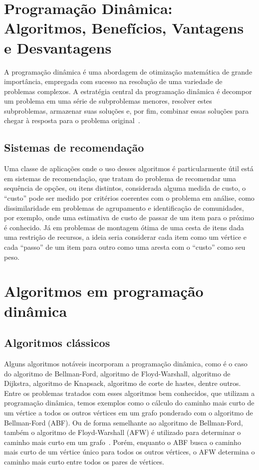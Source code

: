 \section{Programação Dinâmica: Algoritmos, Benefícios, Vantagens e Desvantagens}

A programação dinâmica é uma abordagem de otimização matemática de grande importância, empregada com sucesso na resolução de uma variedade de problemas complexos. A estratégia central da programação dinâmica é decompor um problema em uma série de subproblemas menores, resolver estes subproblemas, armazenar suas soluções e, por fim, combinar essas soluções para chegar à resposta para o problema original~\cite{Bellman1957}.

\subsection{Sistemas de recomendação}

Uma classe de aplicações onde o uso desses algoritmos é particularmente útil está em sistemas de recomendação, que tratam do problema de recomendar uma sequência de opções, ou itens distintos, considerada alguma medida de custo, o ``custo'' pode ser medido por critérios coerentes com o problema em análise, como dissimilaridade em problemas de agrupamento e identificação de comunidades, por exemplo, onde uma estimativa de custo de passar de um item para o próximo é conhecido. Já em problemas de montagem ótima de uma cesta de itens dada uma restrição de recursos, a ideia seria considerar cada item como um vértice e cada ``passo'' de um item para outro como uma aresta com o ``custo'' como seu peso.

\section{Algoritmos em programação dinâmica}
\subsection{Algoritmos clássicos}

Alguns algoritmos notáveis incorporam a programação dinâmica, como é o caso do algoritmo de Bellman-Ford, algoritmo de Floyd-Warshall, algoritmo de Dijkstra, algoritmo de Knapsack, algoritmo de corte de hastes, dentre outros. Entre os problemas tratados com esses algoritmos bem conhecidos, que utilizam a programação dinâmica, temos exemplos como o cálculo do caminho mais curto de um vértice a todos os outros vértices em um grafo ponderado com o algoritmo de Bellman-Ford (ABF). Ou de forma semelhante ao algoritmo de Bellman-Ford, também o algoritmo de Floyd-Warshall (AFW) é utilizado para determinar o caminho mais curto em um grafo~\cite{CormenLeisersonRivestStein2009}. Porém, enquanto o ABF busca o caminho mais curto de um vértice único para todos os outros vértices, o AFW determina o caminho mais curto entre todos os pares de vértices.

